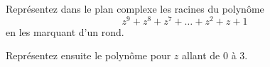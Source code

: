 \begin{exercice}\label{exoMatlab0009}

	Représentez dans le plan complexe les racines du polynôme
	\begin{equation}
		z^9+z^8+z^7+\ldots+z^2+z+1
	\end{equation}
	en les marquant d'un rond.

	Représentez ensuite le polynôme pour $z$ allant de 0 à 3.

\end{exercice}
